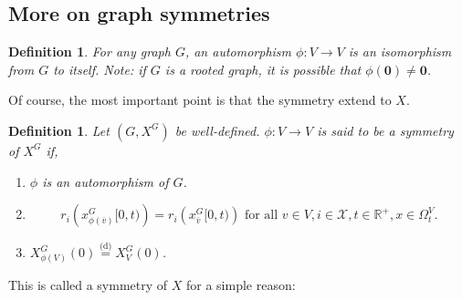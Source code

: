 \documentclass[12pt]{article}
\newcommand{\mb}{\mathbb}
\newcommand{\mc}{\mathcal}
\newcommand{\ra}{\rightarrow}
\newcommand{\ov}{\overline}
\newcommand{\te}{\text}
\newcommand{\deq}{\overset{\text{(d)}}{=}}			%
\newcommand{\sta}{\mc{X}}							%
\newcommand{\cl}[1]{\ov{#1}}						%
\renewcommand{\root}{\mathbf{0}}					%
\newcommand{\Xf}{X}									%
\newcommand{\rate}{r}								%
\newcommand{\xf}{x}									%
\newcommand{\vind}[1]{_{#1}}						%
\newcommand{\tme}[1]{(#1)}							%
\newcommand{\tmi}[1]{#1}							%
\newcommand{\gind}[1]{^{#1}}						%
\newcommand{\vpara}[1]{^{#1}}						%
\newcommand{\stpara}[1]{_{#1}}						%
\newcommand{\tpara}[1]{_{#1}}						%
\newtheorem{defn}[thms]{Definition}
\begin{document}
\subsection{More on graph symmetries}

\begin{defn}
For any graph \(G\), an automorphism \(\phi: V \ra V\) is an isomorphism from \(G\) to itself. Note: if \(G\) is a rooted graph, it is possible that \(\phi(\root) \neq \root\).
\label{a:siso}
\end{defn}

Of course, the most important point is that the symmetry extend to \(\Xf\).

\begin{defn}
Let \((G,\Xf\gind{G})\) be well-defined. \(\phi: V \ra V\) is said to be a symmetry of \(\Xf\gind{G}\) if,

\begin{enumerate}
\item \(\phi\) is an automorphism of \(G\).

\item 

\begin{equation}
\rate\stpara{i}\left(\xf\gind{G}\vind{\phi(\cl{v})}\tmi{[0,t)}\right) = \rate\stpara{i}\left(\xf\gind{G}\vind{\cl{v}}\tmi{[0,t)}\right) \te{ for all } v \in V,i \in \sta, t \in \mb{R}^+, \xf\in \Omega\vpara{V}\tpara{t}.
\label{a::ratesym}
\end{equation}

\item \(\Xf\gind{G}\vind{\phi(V)}\tme{0} \deq \Xf\gind{G}\vind{V}\tme{0}\).
\end{enumerate}
\label{a:Xsim}
\end{defn}

This is called a symmetry of \(\Xf\) for a simple reason:
\end{document}
